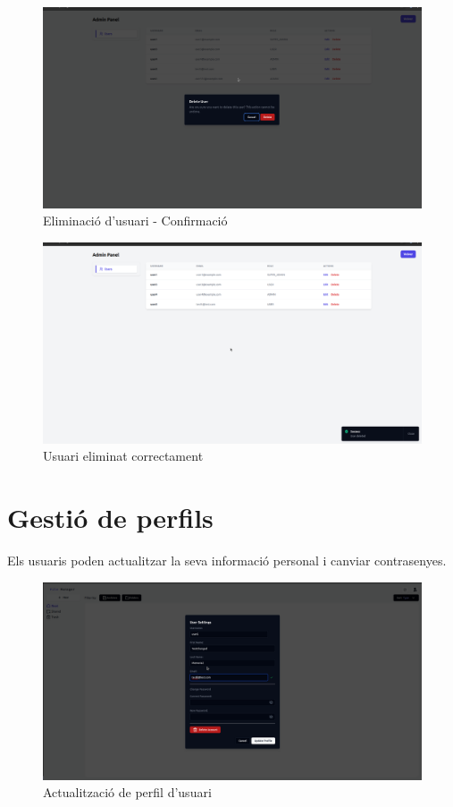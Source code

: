 \begin{figure}[H]
\centering
\includegraphics[width=0.8\linewidth]{Figures/implementacio/adminPanelUserDelete2.png}
\caption{Eliminació d'usuari - Confirmació}
\label{fig:adminPanelUserDelete2}
\end{figure}

\begin{figure}[H]
\centering
\includegraphics[width=0.8\linewidth]{Figures/implementacio/adminPanelUserDeleteSuccess.png}
\caption{Usuari eliminat correctament}
\label{fig:adminPanelUserDeleteSuccess}
\end{figure}

\section{Gestió de perfils}

Els usuaris poden actualitzar la seva informació personal i canviar contrasenyes.

\begin{figure}[H]
\centering
\includegraphics[width=0.8\linewidth]{Figures/implementacio/updateUser.png}
\caption{Actualització de perfil d'usuari}
\label{fig:updateUser}
\end{figure}

